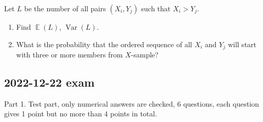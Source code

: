 \documentclass[11pt, a4paper]{article}
\DeclareMathOperator{\Var}{Var}
\DeclareMathOperator{\E}{\mathbb{E}}
\theoremstyle{definition}
\begin{document}
\begin{enumerate}
    Let $L$ be the number of all pairs $(X_i, Y_j)$ such that $X_i > Y_j$.

    \begin{enumerate}
        \item Find $\E(L)$, $\Var(L)$. 
        \item What is the probability that the ordered sequence of all $X_i$ and $Y_j$ will start with 
        three or more members from $X$-sample?
    \end{enumerate}

\end{enumerate}

\subsection{2022-12-22 exam}

Part 1. Test part, only numerical answers are checked, 6 questions, each question gives 1 point but no more than 4 points in total. 
\end{document}
